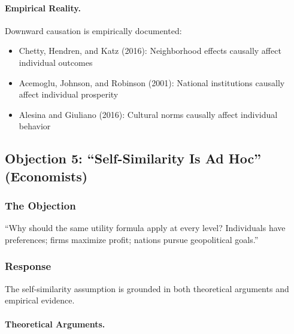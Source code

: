 \paragraph{Empirical Reality.}

Downward causation is empirically documented:
\begin{itemize}[nosep]
\item Chetty, Hendren, and Katz (2016): Neighborhood effects causally affect individual outcomes
\item Acemoglu, Johnson, and Robinson (2001): National institutions causally affect individual prosperity
\item Alesina and Giuliano (2016): Cultural norms causally affect individual behavior
\end{itemize}

\subsection{Objection 5: ``Self-Similarity Is Ad Hoc'' (Economists)}

\subsubsection{The Objection}

\begin{tcolorbox}[colback=red!5!white, colframe=red!75!black, title=Economist's Objection]
``Why should the same utility formula apply at every level? Individuals have 
preferences; firms maximize profit; nations pursue geopolitical goals.''
\end{tcolorbox}

\subsubsection{Response}

The self-similarity assumption is grounded in both theoretical arguments and 
empirical evidence.

\paragraph{Theoretical Arguments.}

